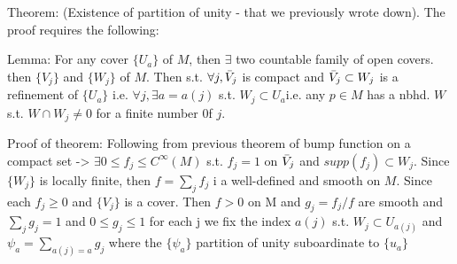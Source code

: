 \documentclass[12pt,letterpaper]{article}
\begin{document}
Theorem: (Existence of partition of unity - that we previously wrote down). The proof requires the following:


Lemma:  For any cover $\{U_a\}$ of $M$, then $\exists$ two countable family of open covers. then $\{V_j\}$ and $\{W_j\}$ of $M$. Then s.t. $\forall j, \Bar{V}_j$ is compact and $\Bar{V}_j \subset W_j$ is a refinement of $\{ U_a \}$ i.e. $\forall j, \exists a = a(j)$ s.t. $W_j \subset U_a$i.e. any $p \in M$ has a nbhd. $W$ s.t. $W \cap W_j \neq 0$ for a finite number 0f $j$.

Proof of theorem: Following from previous theorem of bump function on a compact set -> $\exists 0 \leq f_j \leq C^{\infty}(M)$ s.t. $f_j=1$ on $\Bar{V}_j$ and $supp(f_j) \subset W_j$. Since $\{W_j \}$ is locally finite, then $f = \sum_j f_j$ i a well-defined and smooth on $M$. Since each $f_j \geq 0$ and $\{V_j\}$ is a cover. Then $f > 0$ on M and $g_j = f_j/f$ are smooth and $\sum_j g_j = 1$ and $0\leq g_j \leq 1$ for each j we fix the index $a(j)$ s.t. $W_j \subset U_{a(j)}$ and $\psi_a = \sum_{a(j)=a}g_j$ where the $\{ \psi_a \}$ partition of unity suboardinate to $\{ u_a \}$ 
\end{document}
